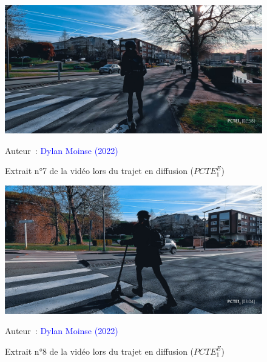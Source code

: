     \begin{figure}[h!]\vspace*{4pt}
        \caption*{Extrait n°7 de la vidéo lors du trajet en diffusion (\(PCTE^{E}_{1}\))}
        \centerline{\includegraphics[width=0.75\columnwidth]{src/Figures/Annexes/Extrait_Video_PCTE1_Egress_7.jpg}}
        \vspace{5pt}
        \begin{flushright}\scriptsize{
        Auteur~: \textcolor{blue}{Dylan Moinse (2022)}
        }\end{flushright}
    \end{figure}

    \begin{figure}[h!]\vspace*{4pt}
        \caption*{Extrait n°8 de la vidéo lors du trajet en diffusion (\(PCTE^{E}_{1}\))}
        \centerline{\includegraphics[width=0.75\columnwidth]{src/Figures/Annexes/Extrait_Video_PCTE1_Egress_8.jpg}}
        \vspace{5pt}
        \begin{flushright}\scriptsize{
        Auteur~: \textcolor{blue}{Dylan Moinse (2022)}
        }\end{flushright}
    \end{figure}

